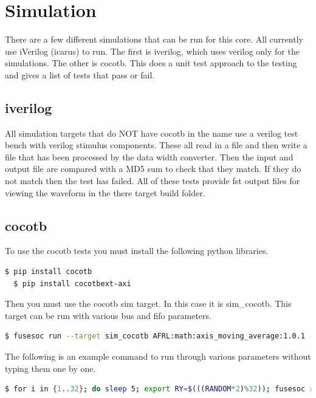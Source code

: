 \newpage

\section{Simulation}
\par
There are a few different simulations that can be run for this core. All currently use iVerilog (icarus) to run. The first is iverilog, which
uses verilog only for the simulations. The other is cocotb. This does a unit test approach to the testing and gives a list of tests that pass
or fail.

\subsection{iverilog}
\par
All simulation targets that do NOT have cocotb in the name use a verilog test bench with verilog stimulus components. These all read in a file
and then write a file that has been processed by the data width converter. Then the input and output file are compared with a MD5 sum to check that they
match. If they do not match then the test has failed. All of these tests provide fst output files for viewing the waveform in the there
target build folder.

\subsection{cocotb}
\par
To use the cocotb tests you must install the following python libraries.
\begin{lstlisting}[language=bash]
  $ pip install cocotb
  $ pip install cocotbext-axi
\end{lstlisting}

Then you must use the cocotb sim target. In this case it is sim\_cocotb. This target can be run with various bus and fifo parameters.
\begin{lstlisting}[language=bash]
  $ fusesoc run --target sim_cocotb AFRL:math:axis_moving_average:1.0.1 --BUS_WIDTH=8 --WEIGHT=32
\end{lstlisting}

The following is an example command to run through various parameters without typing them one by one.
\begin{lstlisting}[language=bash]
  $ for i in {1..32}; do sleep 5; export RY=$(((RANDOM*2)%32)); fusesoc run --target sim_cocotb AFRL:math:axis_moving_average:1.0.1 --BUS_WIDTH=$i --WEIGHT=$RY; echo "BUS WIDTH:" $i "WEIGHT:" $RY; done
\end{lstlisting}
\newpage

